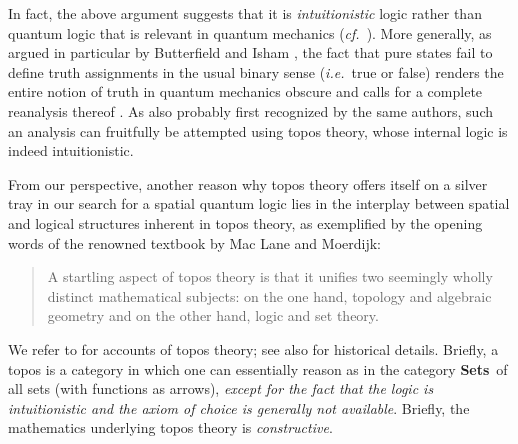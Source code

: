 \documentclass[11pt]{article}
\newcommand{\Sets}{\mbox{\textbf{Sets}}}
\newcommand{\ie}{\textit{i.e.}}
\begin{document}
In fact, the above argument suggests
that it is  {\it intuitionistic} logic rather than quantum logic that
is relevant in quantum mechanics
(\textit{cf.}~\cite{AdelmanCorbett}). More generally, as argued in
particular by Butterfield and  Isham \cite{ButVat,butterfieldisham1}, the fact that pure states fail
to define truth assignments in the usual binary sense (\ie\ true or
false)  renders the entire notion of truth in quantum mechanics
obscure and calls for a complete reanalysis thereof
\cite{doringisham1,doringisham2,doringisham3,doringisham4,doeringisham:review}.
 As also probably first recognized by the same authors,
 such an analysis can fruitfully be attempted using topos theory,
 whose internal logic is indeed intuitionistic.

 From our perspective, another reason why topos theory offers itself on a silver tray in our search for a spatial quantum logic lies
in the  interplay between spatial and logical structures inherent in topos theory, as exemplified by
the opening words of the renowned textbook by Mac Lane and Moerdijk:
\begin{quote}
A startling aspect of topos theory is that it unifies two seemingly wholly distinct mathematical subjects: on the one hand, topology and algebraic geometry and on the other hand, logic and set theory.
\end{quote}

We refer to
\cite{goldblatt84,maclanemoerdijk92,johnstone02a,johnstone02b}  for  accounts of topos theory; see also \cite{bell05,McLarty,kroemer07} for historical details.
Briefly, a topos is a category in which one can essentially reason as in the
category \Sets\ of all sets (with functions as arrows), {\it except for the fact that the logic is intuitionistic and the axiom of choice is generally not available}.  Briefly, the mathematics underlying topos theory is  {\it constructive}.
\end{document}
